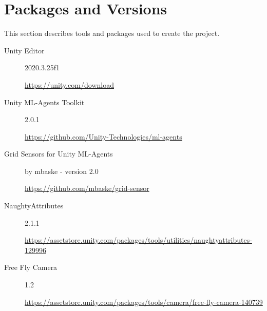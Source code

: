 \chapter{Packages and Versions}
This section describes tools and packages used to create the project.
\begin{description}
    \item[Unity Editor] 2020.3.25f1 
    
    \url{https://unity.com/download}
    
    \item[Unity ML-Agents Toolkit] 2.0.1
    
    \url{https://github.com/Unity-Technologies/ml-agents}
    
    \item[Grid Sensors for Unity ML-Agents] by mbaske - version 2.0
    
    \url{https://github.com/mbaske/grid-sensor}
    
    \item[NaughtyAttributes] 2.1.1
    
    \url{https://assetstore.unity.com/packages/tools/utilities/naughtyattributes-129996}
    
    \item[Free Fly Camera] 1.2
    
    \url{https://assetstore.unity.com/packages/tools/camera/free-fly-camera-140739}
    
\end{description}
